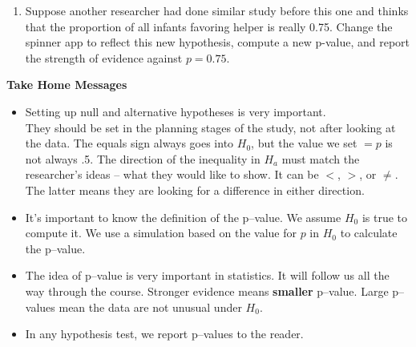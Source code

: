 \begin{enumerate}
\begin{enumerate}
      \item  formulate a hypothesis 
\begin{key}
{\it 1   }
\end{key}


      \item  simulate a distribution 
\begin{key}
        {\it  3}
\end{key}
      \item  compare observed results to the distribution 
\begin{key}
        {\it  4}
\end{key}

  \end{enumerate}

\item Suppose another researcher had done similar study before this
  one and thinks that the proportion of all infants favoring helper is
  really 0.75.  Change the spinner app to reflect this new hypothesis,
   compute a new p-value, and report the strength of evidence
  against $p = 0.75$.  

\end{enumerate}

{\bf Take Home Messages}
\begin{itemize}
  \item Setting up null and alternative hypotheses is very
    important.\\
    They should be set in the planning stages of the study, not after
    looking at the data. 
    The equals sign always goes into $H_0$, but the value we set $ = p$ is not
    always .5.  The direction of the inequality in $H_a$ must match
    the researcher's ideas -- what they would like to show. It can be
    $<$, $>$, or $\neq$.  The latter means they are looking for a
    difference in either direction.
  \item It's important to know the definition of the p--value. We
    assume $H_0$ is true to compute it.  We  use a simulation based
    on the  value for $p$  in $H_0$ to calculate the p--value.    
  \item The idea of p--value is very important in statistics. It will
    follow us all the way through the course. Stronger evidence means
    {\bf smaller} p--value.  Large p--values mean the data are not
    unusual under $H_0$.
  \item In any hypothesis test, we report p--values to the reader.  
\end{itemize}\vfill

